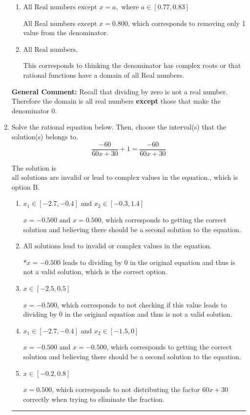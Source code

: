 \documentclass{extbook}[14pt]
\newcommand{\litem}[1]{\item #1

\rule{\textwidth}{0.4pt}}
\begin{document}
\begin{enumerate}
{\begin{enumerate}[label=\Alph*.]
All Real numbers except $x = 20.000$ and $x = 30.000$, which corresponds to not factoring the denominator correctly.
\item \( \text{All Real numbers except } x = a, \text{ where } a \in [0.77, 0.83] \)

All Real numbers except $x = 0.800$, which corresponds to removing only 1 value from the denominator.
\item \( \text{All Real numbers.} \)

This corresponds to thinking the denominator has complex roots or that rational functions have a domain of all Real numbers.
\end{enumerate}

\textbf{General Comment:} Recall that dividing by zero is not a real number. Therefore the domain is all real numbers \textbf{except} those that make the denominator 0.
}
\litem{
Solve the rational equation below. Then, choose the interval(s) that the solution(s) belongs to.
\[ \frac{-60}{60x + 30} + 1 = \frac{-60}{60x + 30} \]

The solution is \( \text{all solutions are invalid or lead to complex values in the equation.} \), which is option B.\begin{enumerate}[label=\Alph*.]
\item \( x_1 \in [-2.7, -0.4] \text{ and } x_2 \in [-0.3,1.4] \)

$x = -0.500 \text{ and } x = 0.500$, which corresponds to getting the correct solution and believing there should be a second solution to the equation.
\item \( \text{All solutions lead to invalid or complex values in the equation.} \)

*$x = -0.500$ leads to dividing by 0 in the original equation and thus is not a valid solution, which is the correct option.
\item \( x \in [-2.5,0.5] \)

$x = -0.500$, which corresponds to not checking if this value leads to dividing by 0 in the original equation and thus is not a valid solution.
\item \( x_1 \in [-2.7, -0.4] \text{ and } x_2 \in [-1.5,0] \)

$x = -0.500 \text{ and } x = -0.500$, which corresponds to getting the correct solution and believing there should be a second solution to the equation.
\item \( x \in [-0.2,0.8] \)

$x = 0.500$, which corresponds to not distributing the factor $60x + 30$ correctly when trying to eliminate the fraction.
\end{enumerate}

}
\end{enumerate}
\end{document}
